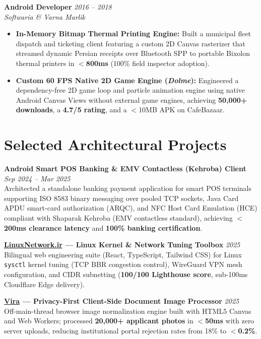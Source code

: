 \documentclass[letterpaper,10pt]{article}
\newcommand{\resumeItem}[1]{
  \item\small{#1}
}
\newcommand{\jobEntry}[4]{
  \textbf{#1} \hfill \textit{\small\color{lightgray}#3 -- #4} \\
  \textit{\small\color{lightgray}#2}
}
\begin{document}
\vspace{3pt}
\jobEntry{Android Developer}{Softwaria \& Varna Marlik}{2016}{2018}
\begin{itemize}
  \resumeItem{\textbf{In-Memory Bitmap Thermal Printing Engine:} Built a municipal fleet dispatch and ticketing client featuring a custom 2D Canvas rasterizer that streamed dynamic Persian receipts over Bluetooth SPP to portable Bixolon thermal printers in \textbf{$<$800ms} (100\% field inspector adoption).}
  \resumeItem{\textbf{Custom 60 FPS Native 2D Game Engine (\textit{Dolme}):} Engineered a dependency-free 2D game loop and particle animation engine using native Android Canvas Views without external game engines, achieving \textbf{50,000+ downloads}, a \textbf{4.7/5 rating}, and a $<$10MB APK on CafeBazaar.}
\end{itemize}

\section{Selected Architectural Projects}

\textbf{Android Smart POS Banking \& EMV Contactless (Kehroba) Client} \hfill \textit{\small\color{lightgray}Sep 2024 -- Mar 2025} \\
{\small Architected a standalone banking payment application for smart POS terminals supporting ISO 8583 binary messaging over pooled TCP sockets, Java Card APDU smart-card authorization (ARQC), and NFC Host Card Emulation (HCE) compliant with Shaparak Kehroba (EMV contactless standard), achieving \textbf{$<$200ms clearance latency} and \textbf{100\% banking certification}.}

\vspace{2pt}
\textbf{\href{https://linuxnetwork.ir}{LinuxNetwork.ir} — Linux Kernel \& Network Tuning Toolbox} \hfill \textit{\small\color{lightgray}2025} \\
{\small Bilingual web engineering suite (React, TypeScript, Tailwind CSS) for Linux \texttt{sysctl} kernel tuning (TCP BBR congestion control), WireGuard VPN mesh configuration, and CIDR subnetting (\textbf{100/100 Lighthouse score}, sub-100ms Cloudflare Edge delivery).}

\vspace{2pt}
\textbf{\href{https://vira.linuxnetwork.ir}{Vira} — Privacy-First Client-Side Document Image Processor} \hfill \textit{\small\color{lightgray}2025} \\
{\small Off-main-thread browser image normalization engine built with HTML5 Canvas and Web Workers; processed \textbf{20,000+ applicant photos} in \textbf{$<$50ms} with zero server uploads, reducing institutional portal rejection rates from 18\% to \textbf{$<$0.2\%}.}
\end{document}
